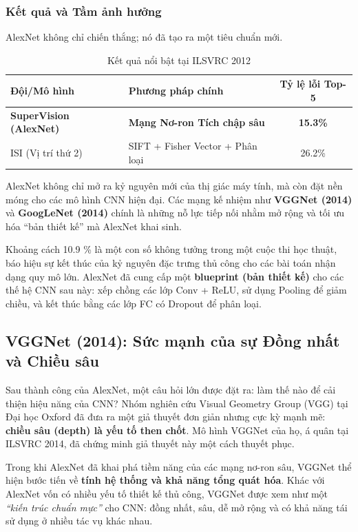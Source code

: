 \subsubsection{Kết quả và Tầm ảnh hưởng}
AlexNet không chỉ chiến thắng; nó đã tạo ra một tiêu chuẩn mới.
\begin{table}[h!]
	\centering
	\caption{Kết quả nổi bật tại ILSVRC 2012}
	\label{tab:imagenet_2012_results}
	\begin{tabular}{|l|p{6cm}|c|}
		\hline
		\textbf{Đội/Mô hình} & \textbf{Phương pháp chính} & \textbf{Tỷ lệ lỗi Top-5} \\
		\hline
		\textbf{SuperVision (AlexNet)} & \textbf{Mạng Nơ-ron Tích chập sâu} & \textbf{15.3\%} \\
		\hline
		ISI (Vị trí thứ 2) & SIFT + Fisher Vector + Phân loại & 26.2\% \\
		\hline
	\end{tabular}
\end{table}

AlexNet không chỉ mở ra kỷ nguyên mới của thị giác máy tính, 
mà còn đặt nền móng cho các mô hình CNN hiện đại. 
Các mạng kế nhiệm như \textbf{VGGNet (2014)} và \textbf{GoogLeNet (2014)} 
chính là những nỗ lực tiếp nối nhằm mở rộng và tối ưu hóa “bản thiết kế” mà AlexNet khai sinh.


Khoảng cách 10.9 \% là một con số không tưởng trong một cuộc thi học thuật, báo hiệu sự kết thúc của kỷ nguyên đặc trưng thủ công cho các bài toán nhận dạng quy mô lớn. AlexNet đã cung cấp một \textbf{blueprint (bản thiết kế)} cho các thế hệ CNN sau này: xếp chồng các lớp Conv + ReLU, sử dụng Pooling để giảm chiều, và kết thúc bằng các lớp FC có Dropout để phân loại.

\subsection{VGGNet (2014): Sức mạnh của sự Đồng nhất và Chiều sâu}
\label{subsec:vggnet}

Sau thành công của AlexNet, một câu hỏi lớn được đặt ra: làm thế nào để cải thiện hiệu năng của CNN? Nhóm nghiên cứu Visual Geometry Group (VGG) tại Đại học Oxford đã đưa ra một giả thuyết đơn giản nhưng cực kỳ mạnh mẽ: \textbf{chiều sâu (depth) là yếu tố then chốt}. Mô hình VGGNet \cite{Simonyan2014} của họ, á quân tại ILSVRC 2014, đã chứng minh giả thuyết này một cách thuyết phục.

Trong khi AlexNet đã khai phá tiềm năng của các mạng nơ-ron sâu, 
VGGNet thể hiện bước tiến về \textbf{tính hệ thống và khả năng tổng quát hóa}. 
Khác với AlexNet vốn có nhiều yếu tố thiết kế thủ công, 
VGGNet được xem như một \textit{“kiến trúc chuẩn mực”} cho CNN: 
đồng nhất, sâu, dễ mở rộng và có khả năng tái sử dụng ở nhiều tác vụ khác nhau.

